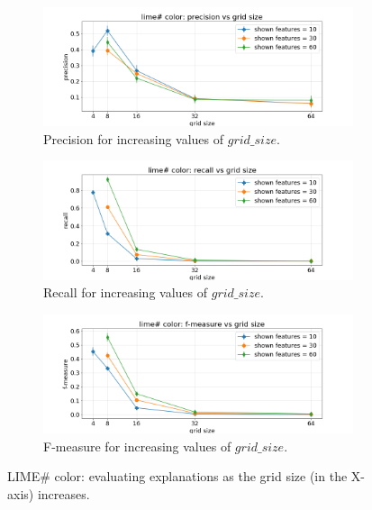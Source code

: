 \documentclass[12pt, twoside, a4paper]{report}
\begin{document}
\newpage


\begin{figure}[h]
\begin{subfigure}[b]{\linewidth}
\includegraphics[width=\linewidth]{images/figs/VSGRID/limesharp color/limesharp color: precision vs grid size.png} 
\caption{Precision for increasing values of $grid\_size$.}
\label{subfig:limesharp_color_prec_vs_gs}
\end{subfigure}
\begin{subfigure}[b]{\linewidth}
\includegraphics[width=\linewidth]{images/figs/VSGRID/limesharp color/limesharp color: recall vs grid size.png} 
\caption{Recall for increasing values of $grid\_size$.}
\label{subfig:limesharp_color_rec_vs_gs}
\end{subfigure}
\begin{subfigure}[b]{\linewidth}
\includegraphics[width=\linewidth]{images/figs/VSGRID/limesharp color/limesharp color: f-measure vs grid size.png} 
\caption{F-measure for increasing values of $grid\_size$.}
\label{subfig:limesharp_color_fmea_vs_gs}
\end{subfigure}
\caption{LIME\# color: evaluating explanations as the grid size (in the X-axis) increases.}
\label{fig:limesharp_color_vs_gs}
\end{figure}
\end{document}
